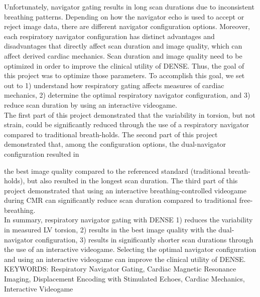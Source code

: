 Unfortunately, navigator gating results in long scan durations due to inconsistent breathing patterns. Depending on how the navigator echo is used to accept or reject image data, there are different navigator configuration options. Moreover, each respiratory navigator configuration has distinct advantages and disadvantages that directly affect scan duration and image quality, which can affect derived cardiac mechanics. Scan duration and image quality need to be optimized in order to improve the clinical utility of DENSE. Thus, the goal of this project was to optimize those parameters. To accomplish this goal, we set out to 1) understand how respiratory gating affects measures of cardiac mechanics, 2) determine the optimal respiratory navigator configuration, and 3) reduce scan duration by using an interactive videogame.\\

The first part of this project demonstrated that the variability in torsion, but not strain, could be significantly reduced through the use of a respiratory navigator compared to traditional breath-holds. The second part of this project demonstrated that, among the configuration options, the dual-navigator configuration resulted in 

\restoregeometry
\thispagestyle{empty} %

\noindent the best image quality compared to the referenced standard (traditional breath-holds), but also resulted in the longest scan duration. The third part of this project demonstrated that using an interactive breathing-controlled videogame during CMR can significantly reduce scan duration compared to traditional free-breathing.\\

In summary, respiratory navigator gating with DENSE 1) reduces the variability in measured LV torsion, 2) results in the best image quality with the dual-navigator configuration, 3) results in significantly shorter scan durations through the use of an interactive videogame. Selecting the optimal navigator configuration and using an interactive videogame can improve the clinical utility of DENSE.\\

\vspace{0.25in}
\noindent KEYWORDS: Respiratory Navigator Gating, Cardiac Magnetic Resonance Imaging, Displacement Encoding with Stimulated Echoes, Cardiac Mechanics, Interactive Videogame

\vspace{5.03125in}        %
					



